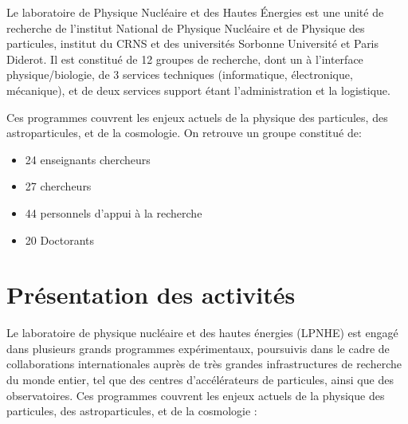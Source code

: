 \documentclass[french,a4paper,12pt]{report}
\begin{document}
  Le laboratoire de Physique Nucléaire et des Hautes Énergies est une unité de recherche de l'institut National de Physique Nucléaire et de Physique des particules, institut du CRNS et des universités Sorbonne Université et Paris Diderot. Il est constitué de 12 groupes de recherche, dont un à l’interface physique/biologie, de 3 services techniques (informatique, électronique, mécanique), et de deux services support étant l'administration et la logistique.
  
  Ces programmes couvrent les enjeux actuels de la physique des particules, des astroparticules, et de la cosmologie.
  On retrouve un groupe constitué de:
  \begin{itemize}
  \item  24 enseignants chercheurs
  \item  27 chercheurs
  \item  44 personnels d'appui à la recherche
  \item  20 Doctorants
  \end{itemize}
  \newpage
  
  \section{Présentation des activités}
  Le laboratoire de physique nucléaire et des hautes énergies (LPNHE) est engagé dans plusieurs grands programmes expérimentaux, poursuivis dans le cadre de collaborations internationales auprès de très grandes infrastructures de recherche du monde entier, tel que des centres d’accélérateurs de particules, ainsi que des observatoires. Ces programmes couvrent les enjeux actuels de la physique des particules, des astroparticules, et de la cosmologie :
  
\end{document}
